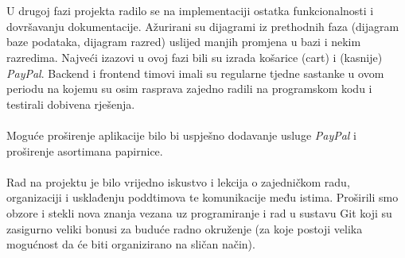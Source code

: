 		\\
		\\
		U drugoj fazi projekta radilo se na implementaciji ostatka funkcionalnosti i dovršavanju dokumentacije. Ažurirani su dijagrami iz prethodnih faza (dijagram baze podataka, dijagram razred) uslijed manjih promjena u bazi i nekim razredima. Najveći izazovi u ovoj fazi bili su izrada košarice (cart) i (kasnije) \textit{PayPal}. Backend i frontend timovi imali su regularne tjedne sastanke u ovom periodu na kojemu su osim rasprava zajedno radili na programskom kodu i testirali dobivena rješenja.
		\\
		\\
		Moguće proširenje aplikacije bilo bi uspješno dodavanje usluge \textit{PayPal} i proširenje asortimana papirnice.
		\\
		\\
		Rad na projektu je bilo vrijedno iskustvo i lekcija o zajedničkom radu, organizaciji i usklađenju poddtimova te komunikacije među istima. Proširili smo obzore i stekli nova znanja vezana uz programiranje i rad u sustavu Git koji su zasigurno veliki bonusi za buduće radno okruženje (za koje postoji velika mogućnost da će biti organizirano na sličan način).
		\eject 